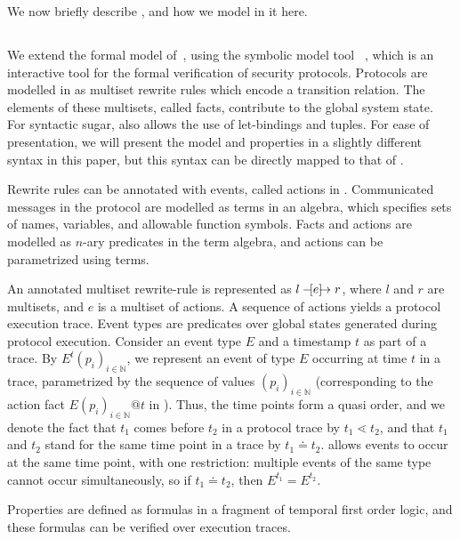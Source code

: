 We now briefly describe \mTamarin{}, and how we model \mEdhoc{} in it 
here.
%

\subsection{\mTamarin{}}
\label{sec:tamarin}
We extend the formal \mEdhoc{} model of~\cite{Norr21}, using the symbolic
model tool \mTamarin{}~\cite{DBLP:conf/cav/MeierSCB13}, which is an 
interactive
tool for the formal verification of security protocols.
%
Protocols are modelled in \mTamarin{} as multiset rewrite rules which encode 
a
transition relation.
%
The elements of these multisets, called facts, contribute to the global
system state.
%
For syntactic sugar, \mTamarin{} also allows the use of let-bindings and tuples.
%
For ease of presentation, we will present the model and properties in a
slightly different syntax in this paper, but this syntax can be directly
mapped to that of \mTamarin.
%

Rewrite rules can be annotated with events, called actions in \mTamarin{}.
%
Communicated messages in the protocol are modelled as terms in an algebra,
which specifies sets of names, variables, and allowable function symbols.
%
Facts and actions are modelled as $n$-ary predicates in the term algebra,
and actions can be parametrized using terms.
%

An annotated multiset rewrite-rule is represented as
$l \ifarrow[e] r$, where $l$ and $r$ are multisets, and $e$ is
a multiset of actions.
%
A sequence of actions yields a protocol execution trace.
%
Event types are predicates over global states generated during protocol 
execution.
%
Consider an event type $E$ and a timestamp $t$ as part of a trace.
%
By $E^{t}(p_i)_{i\in\mathbb{N}}$, we represent an event of type $E$ occurring
at time $t$ in a trace, parametrized by the sequence of values
$(p_i)_{i\in\mathbb{N}}$
(corresponding to the action fact $E(p_i)_{i\in\mathbb{N}}@t$ in \mTamarin).
%
Thus, the time points form a quasi order, and we denote the fact that
$t_{1}$ comes before $t_{2}$ in a protocol trace by
$t_{1} \lessdot t_{2}$, and that $t_{1}$ and $t_{2}$ stand for the same
time point in a trace by $t_{1} \doteq t_{2}$.
%
\mTamarin{} allows events to occur at the same time point, with one
restriction: multiple events of the same type cannot occur simultaneously,
so if $t_{1} \doteq t_{2}$, then $E^{t_{1}} = E^{t_{2}}$.
%

Properties are defined as formulas in a fragment of temporal first order logic,
and these formulas can be verified over execution traces.
%

